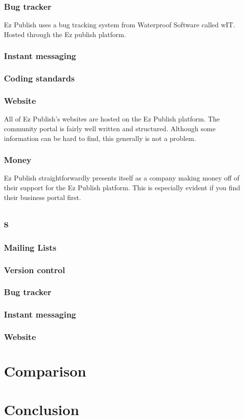 \documentclass{report} %
\begin{document}
\subsubsection{Bug tracker}
Ez Publish uses a bug tracking system from Waterproof Software\cite{waterproofweb} called wIT\cite{waterproofwebwit}. Hosted through the Ez publish platform.
\subsubsection{Instant messaging} %
\subsubsection{Coding standards}
\subsubsection{Website}
All of Ez Publish's websites are hosted on the Ez Publish platform. The community portal\cite{ezcomweb} is fairly well written and structured. Although some information can be hard to find, this generally is not a problem.
\subsubsection{Money}
Ez Publish straightforwardly presents itself as a company making money off of their support for the Ez Publish platform. This is especially evident if you find their business portal\cite{ezpubweb} first.

\subsection{s}
\subsubsection{Mailing Lists}
\subsubsection{Version control}
\subsubsection{Bug tracker}
\subsubsection{Instant messaging}
\subsubsection{Website}

\section{Comparison}

\section{Conclusion} %

\end{document}
